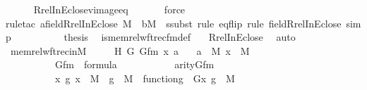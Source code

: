 \begin{isabellebody}
\ \ \ \ \isamarkupfalse%
\ Rrel{\isacharunderscore}{\kern0pt}InEclose{\isacharunderscore}{\kern0pt}vimage{\isacharunderscore}{\kern0pt}eq\isanewline
\ \ \ \ \ \isamarkupfalse%
\ force\isanewline
\ \ \ \ \isamarkupfalse%
{\isacharparenleft}{\kern0pt}rule{\isacharunderscore}{\kern0pt}tac\ a{\isacharequal}{\kern0pt}{\isachardoublequoteopen}field{\isacharparenleft}{\kern0pt}Rrel{\isacharparenleft}{\kern0pt}InEclose{\isacharcomma}{\kern0pt}\ M{\isacharparenright}{\kern0pt}{\isacharparenright}{\kern0pt}{\isachardoublequoteclose}\ \ b{\isacharequal}{\kern0pt}M\ \ ssubst{\isacharcomma}{\kern0pt}\ rule\ eq{\isacharunderscore}{\kern0pt}flip{\isacharcomma}{\kern0pt}\ rule\ field{\isacharunderscore}{\kern0pt}Rrel{\isacharunderscore}{\kern0pt}InEclose{\isacharcomma}{\kern0pt}\ simp{\isacharparenright}{\kern0pt}\isanewline
\ \ \ \ \isamarkupfalse%
\isanewline
\isanewline
\ \ \isamarkupfalse%
\ \isamarkupfalse%
\ {\isacharquery}{\kern0pt}thesis\ \isamarkupfalse%
\ is{\isacharunderscore}{\kern0pt}memrel{\isacharunderscore}{\kern0pt}wftrec{\isacharunderscore}{\kern0pt}fm{\isacharunderscore}{\kern0pt}def\ \ \isamarkupfalse%
\ Rrel{\isacharunderscore}{\kern0pt}InEclose\ \isamarkupfalse%
\ auto\isanewline
{}\isamarkupfalse%
%
\endisatagproof
{\isafoldproof}%
%
\isadelimproof
\isanewline
%
\endisadelimproof
\isanewline
{}\isamarkupfalse%
\ memrel{\isacharunderscore}{\kern0pt}wftrec{\isacharunderscore}{\kern0pt}in{\isacharunderscore}{\kern0pt}M\ {\isacharcolon}{\kern0pt}\ \isanewline
\ \ \ H\ G\ Gfm\ x\ a\isanewline
\ \ \ {\isachardoublequoteopen}a\ {\isasymin}\ M{\isachardoublequoteclose}\ {\isachardoublequoteopen}x\ {\isasymin}\ M{\isachardoublequoteclose}\ \isanewline
\ \ \ \ \ \ \ \ \ \ {\isachardoublequoteopen}Gfm\ {\isasymin}\ formula{\isachardoublequoteclose}\ \isanewline
\ \ \ \ \ \ \ \ \ \ {\isachardoublequoteopen}arity{\isacharparenleft}{\kern0pt}Gfm{\isacharparenright}{\kern0pt}\ {\isasymle}\ {}{\isachardoublequoteclose}\ \isanewline
\ \ \ \ \ \ \ \ \ \ {\isachardoublequoteopen}{\isasymAnd}x\ g{\isachardot}{\kern0pt}\ x\ {\isasymin}\ M\ {\isasymLongrightarrow}\ g\ {\isasymin}\ M\ {\isasymLongrightarrow}\ function{\isacharparenleft}{\kern0pt}g{\isacharparenright}{\kern0pt}\ {\isasymLongrightarrow}\ G{\isacharparenleft}{\kern0pt}x{\isacharcomma}{\kern0pt}\ g{\isacharparenright}{\kern0pt}\ {\isasymin}\ M{\isachardoublequoteclose}\ \isanewline

\end{isabellebody}
